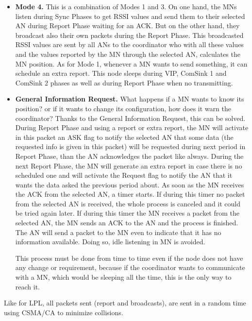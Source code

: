 \begin{itemize}
 \item \textbf{Mode 4.} This is a combination of Modes 1 and 3. On one hand, the \acp{MN} listen during Sync Phases to get \ac{RSSI} values and send them
to their selected \ac{AN} during Report Phase waiting for an \ac{ACK}. But on the other hand, they broadcast also their own packets during the Report Phase.
This broadcasted \ac{RSSI} values are sent by all \acp{AN} to the coordinator who with all these values and the values reported by the \ac{MN} through the 
selected \ac{AN}, calculates the \ac{MN} position. As for Mode 1, whenever a \ac{MN} wants to send something, it can schedule an extra report. This node sleeps
during \ac{VIP}, ComSink 1 and ComSink 2 phases as well as during Report Phase when no transmitting.

 \item \textbf{General Information Request.} What happens if a \ac{MN} wants to know its position? or if it wants to change its configuration, how does it
warn the coordinator? Thanks to the General Information Request, this can be solved. During Report Phase and using a report or extra report, the \ac{MN}
will activate in this packet an ASK flag to notify the selected \ac{AN} that some data (the requested info is given in this packet) will be requested 
during next period in Report Phase, than the \ac{AN} acknowledges the packet like always. During the next Report Phase, the \ac{MN} will generate an extra
report in case there is no scheduled one and will activate the Request flag to notify the \ac{AN} that it wants the data asked the previous period about. As soon
as the \ac{MN} receives the \ac{ACK} from the selected \ac{AN}, a timer starts. If during this timer no packet from the selected \ac{AN} is received, the whole
process is canceled and it could be tried again later. If during this timer the \ac{MN} receives a packet from the selected \ac{AN}, the \ac{MN} sends an
\ac{ACK} to the \ac{AN} and the process is finished. The \ac{AN} will send a packet to the \ac{MN} even to indicate that it has no information available.
Doing so, idle listening in \ac{MN} is avoided.

This process must be done from time to time even if the node does not have any change or requirement, because if the coordinator wants to communicate with a
\ac{MN}, which would be sleeping all the time, this is the only way to reach it.
\end{itemize}

Like for \ac{LPL}, all packets sent (report and broadcasts), are sent in a random time using \ac{CSMA/CA} to minimize collisions.

